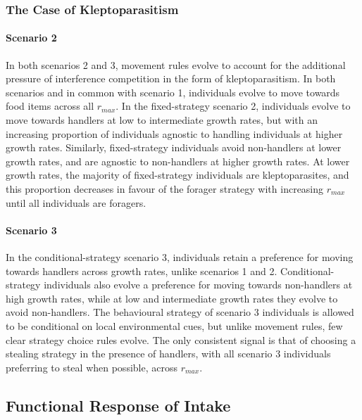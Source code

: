 \documentclass[11pt]{article}
\begin{document}
\subsubsection{The Case of Kleptoparasitism}

\paragraph{Scenario 2}

In both scenarios 2 and 3, movement rules evolve to account for the additional pressure of interference competition in the form of kleptoparasitism.
In both scenarios and in common with scenario 1, individuals evolve to move towards food items across all $r_{max}$.
In the fixed-strategy scenario 2, individuals evolve to move towards handlers at low to intermediate growth rates, but with an increasing proportion of individuals agnostic to handling individuals at higher growth rates.
Similarly, fixed-strategy individuals avoid non-handlers at lower growth rates, and are agnostic to non-handlers at higher growth rates.
At lower growth rates, the majority of fixed-strategy individuals are kleptoparasites, and this proportion decreases in favour of the forager strategy with increasing $r_{max}$ until all individuals are foragers.

\paragraph{Scenario 3}

In the conditional-strategy scenario 3, individuals retain a preference for moving towards handlers across growth rates, unlike scenarios 1 and 2.
Conditional-strategy individuals also evolve a preference for moving towards non-handlers at high growth rates, while at low and intermediate growth rates they evolve to avoid non-handlers.
The behavioural strategy of scenario 3 individuals is allowed to be conditional on local environmental cues, but unlike movement rules, few clear strategy choice rules evolve.
The only consistent signal is that of choosing a stealing strategy in the presence of handlers, with all scenario 3 individuals preferring to steal when possible, across $r_{max}$.

\subsection{Functional Response of Intake}
\end{document}
